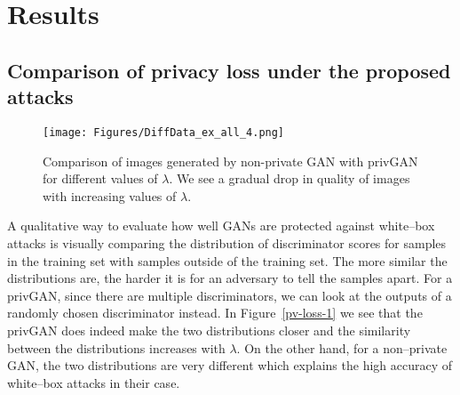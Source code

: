 \documentclass{article}
\begin{document}
\section{Results}
\subsection{Comparison of privacy loss under the proposed attacks}
\begin{figure*}[h!]
    \centering
    \texttt{[image: Figures/DiffData\_ex\_all\_4.png]}
    \caption{Comparison of images generated by non-private GAN with privGAN for different values of $\lambda$. We see a gradual drop in quality of images with increasing values of $\lambda$.}
    \label{gen-mnist}
\end{figure*}

A qualitative way to evaluate how well GANs are protected against white--box attacks is visually comparing the distribution of discriminator scores for samples in the training set with samples outside of the training set. The more similar the distributions are, the harder it is for an adversary to tell the samples apart. For a privGAN, since there are multiple discriminators, we can look at the outputs of a randomly chosen discriminator instead. In Figure~\ref{pv-loss-1} we see that the privGAN does indeed make the two distributions closer and the similarity between the distributions increases with $\lambda$. On the other hand, for a non--private GAN, the two distributions are very different which explains the high accuracy of white--box attacks in their case. 
\end{document}
